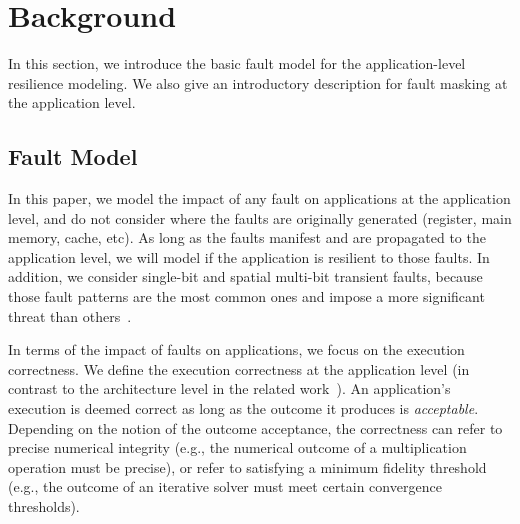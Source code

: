 \section{Background}
\label{sec:bac}
In this section, we introduce the basic fault model for the application-level resilience modeling.
We also give an introductory description for fault masking at the application level. %
 
\subsection{Fault Model}

In this paper, we model the impact of any fault on applications at the application level, 
and do not consider where the faults are originally generated (register, main memory, cache, etc). 
As long as the faults manifest and are propagated to the application level,
we will model if the application is resilient to those faults.  
In addition, we consider single-bit and spatial multi-bit transient faults, because those fault patterns are the most common
ones and impose a more significant threat than others~\cite{asplos15:vilas, fengshui_sc13, micro14:wilkening}. 

In terms of the impact of faults on applications, we focus on the execution correctness. 
We define the execution correctness at the application level (in contrast to the architecture level in the related work~\cite{isca05:mukherjee, micro03:mukherjee}).
An application's execution is deemed correct as long as the outcome it produces is \textit{acceptable}.
Depending on the notion of the outcome acceptance, the correctness can refer to precise numerical integrity 
(e.g., the numerical outcome of a multiplication operation must be precise), 
or refer to satisfying a minimum fidelity threshold (e.g., the outcome of an iterative solver must meet certain convergence thresholds).    

